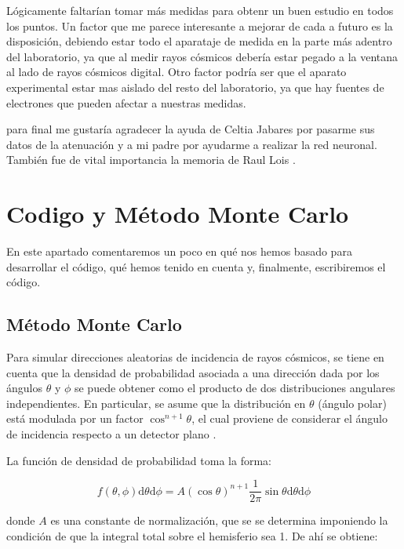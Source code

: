 \documentclass[11pt]{article}
\newcommand{\D}{\mathrm{d}}
\begin{document}
Lógicamente faltarían tomar más medidas para obtenr un buen estudio en todos los puntos. Un factor que me parece interesante a mejorar de cada a futuro es la disposición, debiendo estar todo el aparataje de medida en la parte más adentro del laboratorio, ya que al medir rayos cósmicos debería estar pegado a la ventana al lado de rayos cósmicos digital. Otro factor podría ser que el aparato experimental estar mas aislado del resto del laboratorio, ya que hay fuentes de electrones que pueden afectar a nuestras medidas. 

para final me gustaría agradecer la ayuda de Celtia Jabares por pasarme sus datos de la atenuación y a mi padre por ayudarme a realizar la red neuronal. También fue de vital importancia la memoria de Raul Lois \cite{Raul}.

\newpage

\appendix

\section{Codigo y Método Monte Carlo}

En este apartado comentaremos un poco en qué nos hemos basado para desarrollar el código, qué hemos tenido en cuenta y, finalmente, escribiremos el código. 

\subsection{Método Monte Carlo}

Para simular direcciones aleatorias de incidencia de rayos cósmicos, se tiene en cuenta que la densidad de probabilidad asociada a una dirección dada por los ángulos $\theta$ y $\phi$ se puede obtener como el producto de dos distribuciones angulares independientes. En particular, se asume que la distribución en $\theta$ (ángulo polar) está modulada por un factor $\cos^{n+1}\theta$, el cual proviene de considerar el ángulo de incidencia respecto a un detector plano \cite{N8}.

La función de densidad de probabilidad toma la forma:

\begin{equation}
f(\theta, \phi) \D  \theta \D \phi = A (\cos\theta)^{n+1} \frac{1}{2\pi} \sin\theta \D \theta \D  \phi
\end{equation}

donde $A$ es una constante de normalización, que se se determina imponiendo la condición de que la integral total sobre el hemisferio sea 1. De ahí se obtiene:
\end{document}
